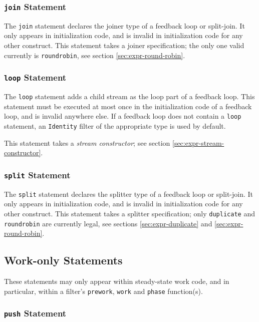 \documentclass[11pt]{article}
\begin{document}
\subsubsection{\lstinline|join| Statement}

The \lstinline|join| statement declares the joiner type of a feedback
loop or split-join.  It only appears in initialization code, and is
invalid in initialization code for any other construct.  This
statement takes a joiner specification; the only one valid currently
is \lstinline|roundrobin|, see section \ref{sec:expr-round-robin}.

\subsubsection{\lstinline|loop| Statement}

The \lstinline|loop| statement adds a child stream as the loop part of
a feedback loop.  This statement must be executed at most once in the
initialization code of a feedback loop, and is invalid anywhere else.
If a feedback loop does not contain a \lstinline|loop| statement, an
\lstinline|Identity| filter of the appropriate type is used by
default.

This statement takes a \emph{stream constructor}; see section
\ref{sec:expr-stream-constructor}.

\subsubsection{\lstinline|split| Statement}

The \lstinline|split| statement declares the splitter type of a feedback
loop or split-join.  It only appears in initialization code, and is
invalid in initialization code for any other construct.  This
statement takes a splitter specification; only \lstinline|duplicate| and
\lstinline|roundrobin| are currently legal, see sections
\ref{sec:expr-duplicate} and \ref{sec:expr-round-robin}.


\subsection{Work-only Statements}

These statements may only appear within steady-state work code, and in
particular, within a filter's \lstinline|prework|, \lstinline|work|
and \lstinline|phase| function(s).

\subsubsection{\lstinline|push| Statement}
\end{document}
